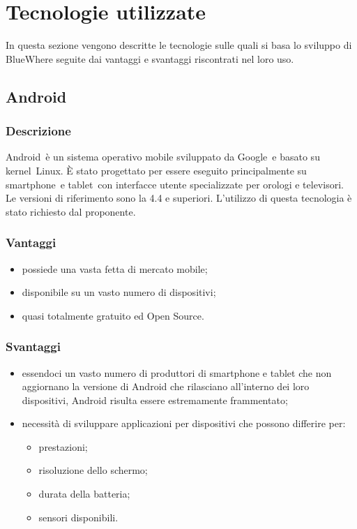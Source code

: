 \documentclass[../SpecificaTecnica.tex]{subfiles}
\begin{document}
\section{Tecnologie utilizzate}
	In questa sezione vengono descritte le tecnologie sulle quali si basa lo sviluppo di BlueWhere seguite dai vantaggi e svantaggi riscontrati nel loro uso.
	
	\subsection{Android}
		\subsubsection{Descrizione}
			Android\g\ è un sistema operativo mobile sviluppato da Google\g\ e basato su kernel\g\ Linux\g. È stato progettato per essere eseguito principalmente su smartphone\g\ e tablet\g\, con interfacce utente specializzate per orologi e televisori. Le versioni di riferimento sono la 4.4 e superiori. L'utilizzo di questa tecnologia è stato richiesto dal proponente.
		\subsubsection{Vantaggi}
			\begin{itemize}
				\item possiede una vasta fetta di mercato mobile;
				\item disponibile su un vasto numero di dispositivi;
				\item quasi totalmente gratuito ed Open Source\g.
			\end{itemize}
		\subsubsection{Svantaggi}
			\begin{itemize}
				\item essendoci un vasto numero di produttori di smartphone e tablet che non aggiornano la versione di Android che rilasciano all'interno dei loro dispositivi, Android risulta essere estremamente frammentato;
				\item necessità di sviluppare applicazioni per dispositivi che possono differire per:
					\begin{itemize}
						\item prestazioni;
						\item risoluzione dello schermo;
						\item durata della batteria;
						\item sensori disponibili.
					\end{itemize}
			\end{itemize}
			
\end{document}
